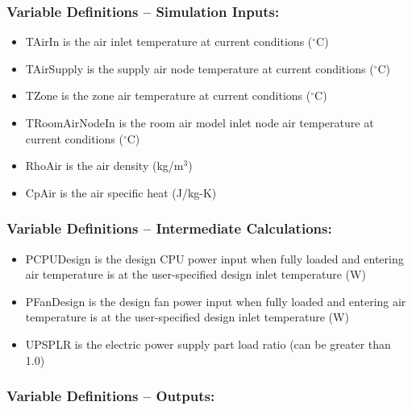 \subsubsection{Variable Definitions -- Simulation Inputs:}\label{variable-definitions-simulation-inputs}

\begin{itemize}
\tightlist
\item
  TAirIn is the air inlet temperature at current conditions (\(^{\circ}\)C)
\item
  TAirSupply is the supply air node temperature at current conditions (\(^{\circ}\)C)
\item
  TZone is the zone air temperature at current conditions (\(^{\circ}\)C)
\item
  TRoomAirNodeIn is the room air model inlet node air temperature at current conditions (\(^{\circ}\)C)
\item
  RhoAir is the air density (kg/m\(^3\))
\item
  CpAir is the air specific heat (J/kg-K)
\end{itemize}

\subsubsection{Variable Definitions -- Intermediate Calculations:}\label{variable-definitions-intermediate-calculations}

\begin{itemize}
\tightlist
\item
  PCPUDesign is the design CPU power input when fully loaded and entering air temperature is at the user-specified design inlet temperature (W)
\item
  PFanDesign is the design fan power input when fully loaded and entering air temperature is at the user-specified design inlet temperature (W)
\item
  UPSPLR is the electric power supply part load ratio (can be greater than 1.0)
\end{itemize}

\subsubsection{Variable Definitions -- Outputs:}\label{variable-definitions-outputs}

